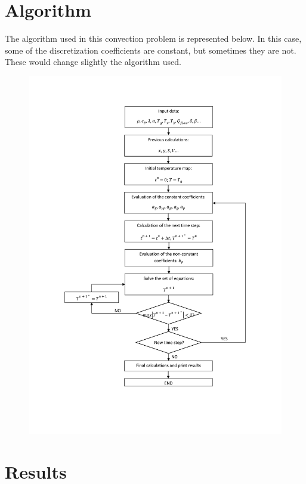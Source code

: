 \section{Algorithm}
The algorithm used in this convection problem is represented below. In this case, some of the discretization coefficients are constant, but sometimes they are not. These would change slightly the algorithm used.
\begin{figure}
	\centering
	\includegraphics[scale=0.21]{FourMaterials/algorithm}
\end{figure}

\section{Results}